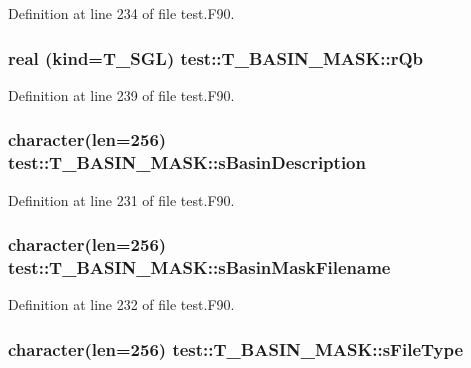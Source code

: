 Definition at line 234 of file test.F90.

\hypertarget{typetest_1_1_t___b_a_s_i_n___m_a_s_k_a70edd292207574b623182d89d64a2ad1}{
\subsubsection[{rQb}]{\setlength{\rightskip}{0pt plus 5cm}real (kind={\bf T\_\-SGL}) {\bf test::T\_\-BASIN\_\-MASK::rQb}}}
\label{typetest_1_1_t___b_a_s_i_n___m_a_s_k_a70edd292207574b623182d89d64a2ad1}


Definition at line 239 of file test.F90.

\hypertarget{typetest_1_1_t___b_a_s_i_n___m_a_s_k_ab83349c9e0bb48c0ccd4a7753f413ac5}{
\subsubsection[{sBasinDescription}]{\setlength{\rightskip}{0pt plus 5cm}character(len=256) {\bf test::T\_\-BASIN\_\-MASK::sBasinDescription}}}
\label{typetest_1_1_t___b_a_s_i_n___m_a_s_k_ab83349c9e0bb48c0ccd4a7753f413ac5}


Definition at line 231 of file test.F90.

\hypertarget{typetest_1_1_t___b_a_s_i_n___m_a_s_k_a008875fe4bfe1fd8b563f93352959a18}{
\subsubsection[{sBasinMaskFilename}]{\setlength{\rightskip}{0pt plus 5cm}character(len=256) {\bf test::T\_\-BASIN\_\-MASK::sBasinMaskFilename}}}
\label{typetest_1_1_t___b_a_s_i_n___m_a_s_k_a008875fe4bfe1fd8b563f93352959a18}


Definition at line 232 of file test.F90.

\hypertarget{typetest_1_1_t___b_a_s_i_n___m_a_s_k_a3c9ab13aa853a845ec98fa82fd0365fe}{
\subsubsection[{sFileType}]{\setlength{\rightskip}{0pt plus 5cm}character(len=256) {\bf test::T\_\-BASIN\_\-MASK::sFileType}}}
\label{typetest_1_1_t___b_a_s_i_n___m_a_s_k_a3c9ab13aa853a845ec98fa82fd0365fe}


